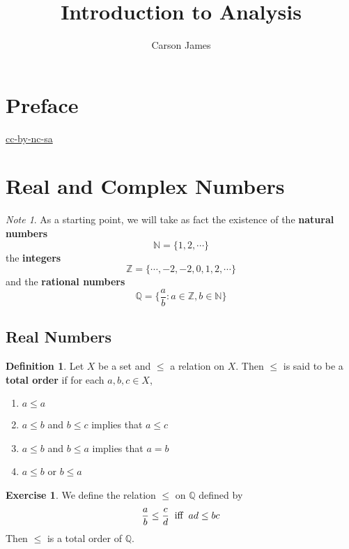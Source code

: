 \documentclass[12pt]{amsart}
\theoremstyle{definition}
\newtheorem{defn}[definition]{Definition}
\theoremstyle{remark}
\newtheorem{note}[remark]{Note}
\theoremstyle{definition}
\newtheorem{ex}[definition]{Exercise}
\newcommand{\N}{\mathbb{N}}
\newcommand{\Z}{\mathbb{Z}}
\newcommand{\Q}{\mathbb{Q}}
\begin{document}
	
	\title{Introduction to Analysis}
	\author{Carson James}
	\maketitle
	
	\tableofcontents
	
	\section*{Preface}
	\begin{flushleft}
		\href{https://creativecommons.org/licenses/by-nc-sa/4.0/legalcode.txt}{cc-by-nc-sa}
	\end{flushleft}

	
	
	\newpage
	

	\newpage
	
	\section{Real and Complex Numbers}
	\begin{note}
		As a starting point, we will take as fact the existence of the \textbf{natural numbers} $$\N = \{1, 2, \cdots\}$$ the \textbf{integers} $$\Z = \{\cdots, -2, -2, 0, 1, 2, \cdots\}$$ and the \textbf{rational numbers} $$\Q = \bigg \{\frac{a}{b}: a \in \Z, b \in \N \bigg \}$$
	\end{note}
	\subsection{Real Numbers}
	
	\begin{defn}
		Let $X$ be a set and $\leq$ a relation on $X$. Then $\leq$ is said to be a \textbf{total order} if for each $a,b,c \in X$,
		\begin{enumerate}
			\item $a \leq a$
			\item $a \leq b$ and $b \leq c$ implies that $a \leq  c$ 
			\item $a \leq b$ and $b \leq a$ implies that $a = b$ 
			\item $a \leq b$ or $b \leq a$
		\end{enumerate}
	\end{defn}

	\begin{ex}
		We define the relation $\leq$ on $\Q$ defined by $$\frac{a}{b} \leq \frac{c}{d} \hspace{.2cm} \text{iff} \hspace{.2cm} ad \leq bc$$ Then $\leq$ is a total order of $\Q$.
	\end{ex}
\end{document}
